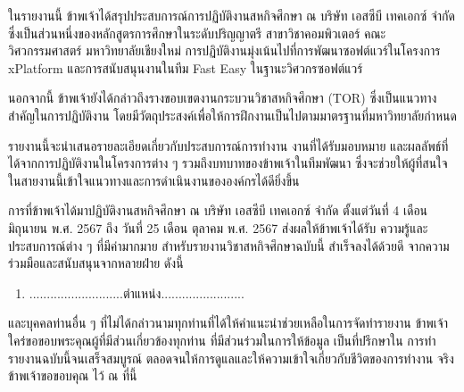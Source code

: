 \maketitle
\makesignature

\ifproject
\begin{abstractTH}
    ในรายงานนี้ ข้าพเจ้าได้สรุปประสบการณ์การปฏิบัติงานสหกิจศึกษา ณ บริษัท เอสซีบี เทคเอกซ์ จำกัด ซึ่งเป็นส่วนหนึ่งของหลักสูตรการศึกษาในระดับปริญญาตรี สาขาวิชาคอมพิวเตอร์ คณะวิศวกรรมศาสตร์ มหาวิทยาลัยเชียงใหม่ การปฏิบัติงานมุ่งเน้นไปที่การพัฒนาซอฟต์แวร์ในโครงการ xPlatform และการสนับสนุนงานในทีม Fast Easy ในฐานะวิศวกรซอฟต์แวร์
    
    นอกจากนี้ ข้าพเจ้ายังได้กล่าวถึงรางขอบเขตงานกระบวนวิชาสหกิจศึกษา (TOR) ซึ่งเป็นแนวทางสำคัญในการปฏิบัติงาน โดยมีวัตถุประสงค์เพื่อให้การฝึกงานเป็นไปตามมาตรฐานที่มหาวิทยาลัยกำหนด
    
    รายงานนี้จะนำเสนอรายละเอียดเกี่ยวกับประสบการณ์การทำงาน งานที่ได้รับมอบหมาย และผลลัพธ์ที่ได้จากการปฏิบัติงานในโครงการต่าง ๆ รวมถึงบทบาทของข้าพเจ้าในทีมพัฒนา ซึ่งจะช่วยให้ผู้ที่สนใจในสายงานนี้เข้าใจแนวทางและการดำเนินงานขององค์กรได้ดียิ่งขึ้น
\end{abstractTH}
    
    


\iffalse
\begin{dedication}
This document is dedicated to all Chiang Mai University students.

Dedication page is optional.
\end{dedication}
\fi %

\begin{acknowledgments}
    การที่ข้าพเจ้าได้มาปฏิบัติงานสหกิจศึกษา ณ บริษัท เอสซีบี เทคเอกซ์ จำกัด ตั้งแต่วันที่ 4 เดือน มิถุนายน
     พ.ศ. 2567 ถึง วันที่ 25 เดือน ตุลาคม พ.ศ. 2567 ส่งผลให้ข้าพเจ้าได้รับ
    ความรู้และประสบการณ์ต่าง ๆ ที่มีค่ามากมาย สำหรับรายงานวิชาสหกิจศึกษาฉบับนี้ สำเร็จลงได้ด้วยดี
    จากความร่วมมือและสนับสนุนจากหลายฝ่าย ดังนี้
    \begin{enumerate}
        \item ...........................ตำแหน่ง........................
    \end{enumerate}
    และบุคคลท่านอื่น ๆ ที่ไม่ได้กล่าวนามทุกท่านที่ได้ให้คำแนะนำช่วยเหลือในการจัดทำรายงาน
    ข้าพเจ้าใคร่ขอขอบพระคุณผู้ที่มีส่วนเกี่ยวข้องทุกท่าน ที่มีส่วนร่วมในการให้ข้อมูล เป็นที่ปรึกษาใน
    การทำรายงานฉบับนี้จนเสร็จสมบูรณ์ ตลอดจนให้การดูแลและให้ความเข้าใจเกี่ยวกับชีวิตของการทำงาน
    จริง ข้าพเจ้าขอขอบคุณ ไว้ ณ ที่นี้

\end{acknowledgments}%
\fi %


